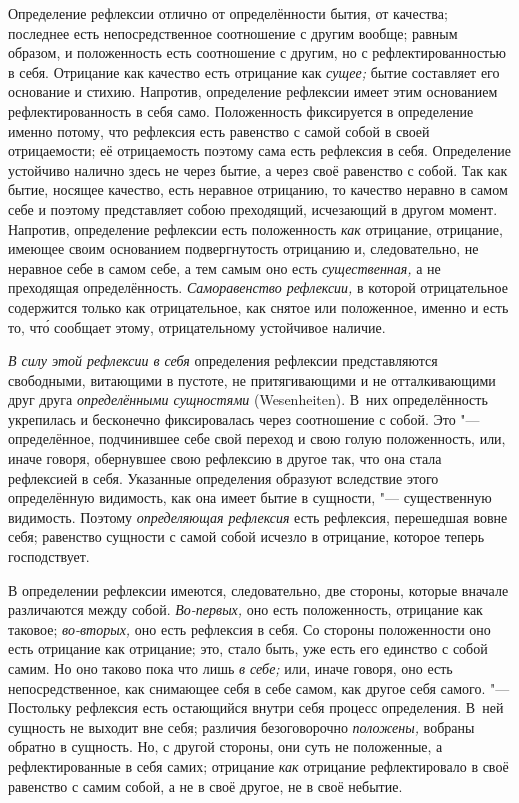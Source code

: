 Определение рефлексии отлично от определённости бытия, от качества;
последнее есть непосредственное соотношение с другим вообще; равным
образом, и положенность есть соотношение с другим, но с рефлектированностью
в себя. Отрицание как качество есть отрицание как
{\em сущее;} бытие составляет его основание и стихию.
Напротив, определение рефлексии имеет этим основанием рефлектированность в
себя само. Положенность фиксируется в определение именно потому, что
рефлексия есть равенство с самой собой в своей отрицаемости; её
отрицаемость поэтому сама есть рефлексия в себя. Определение устойчиво
налично здесь не через бытие, а через своё равенство с собой. Так как
бытие, носящее качество, есть неравное отрицанию, то качество неравно в
самом себе и поэтому представляет собою преходящий, исчезающий в другом
момент. Напротив, определение рефлексии есть положенность
{\em как} отрицание, отрицание, имеющее своим
основанием подвергнутость отрицанию и, следовательно, не неравное себе в
самом себе, а тем самым оно есть {\em существенная,} а
не преходящая определённость. {\em Саморавенство
рефлексии,} в которой отрицательное содержится только как отрицательное,
как снятое или положенное, именно и есть то, чт\'{о} сообщает этому,
отрицательному устойчивое наличие.

{\em В силу этой рефлексии в себя} определения рефлексии
представляются свободными, витающими в пустоте, не притягивающими и не
отталкивающими друг друга {\em определёнными сущностями} (Wesenheiten). В~них
определённость укрепилась и бесконечно
фиксировалась через соотношение с собой. Это "--- определённое, подчинившее
себе свой переход и свою голую положенность, или, иначе говоря, обернувшее
свою рефлексию в другое так, что она стала рефлексией в себя. Указанные
определения образуют вследствие этого определённую видимость, как она имеет
бытие в сущности, "--- существенную видимость. Поэтому
{\em определяющая рефлексия} есть рефлексия, перешедшая
вовне себя; равенство сущности с самой собой исчезло в отрицание, которое
теперь господствует.

В определении рефлексии имеются, следовательно, две стороны, которые вначале
различаются между собой. {\em Во-первых,} оно есть
положенность, отрицание как таковое; {\em во-вторых,}
оно есть рефлексия в себя. Со стороны положенности оно есть отрицание как
отрицание; это, стало быть, уже есть его единство с собой самим. Но оно
таково пока что лишь {\em в себе;} или, иначе говоря,
оно есть непосредственное, как снимающее себя в себе самом, как другое себя
самого. "--- Постольку рефлексия есть остающийся внутри себя процесс
определения. В~ней сущность не выходит вне себя; различия безоговорочно
{\em положены,} вобраны обратно в сущность. Но, с
другой стороны, они суть не положенные, а рефлектированные в себя самих;
отрицание {\em как} отрицание рефлектировало в своё
равенство с самим собой, а не в своё другое, не в своё небытие.

